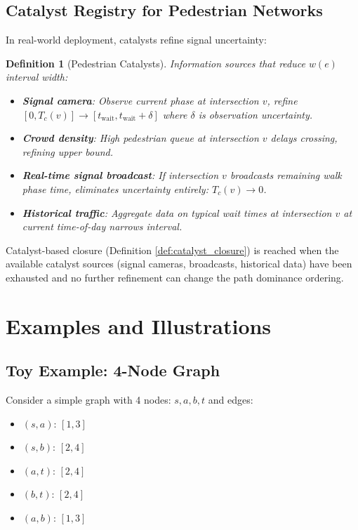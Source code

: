 \documentclass[twocolumn,11pt,a4paper]{article}
\newtheorem{definition}[theorem]{Definition}
\theoremstyle{definition}
\begin{document}
\subsection{Catalyst Registry for Pedestrian Networks}

In real-world deployment, catalysts refine signal uncertainty:

\begin{definition}[Pedestrian Catalysts]
Information sources that reduce $w(e)$ interval width:
\begin{itemize}
\item \textbf{Signal camera}: Observe current phase at intersection $v$, refine $[0, T_c(v)] \to [t_{\text{wait}}, t_{\text{wait}} + \delta]$ where $\delta$ is observation uncertainty.
\item \textbf{Crowd density}: High pedestrian queue at intersection $v$ delays crossing, refining upper bound.
\item \textbf{Real-time signal broadcast}: If intersection $v$ broadcasts remaining walk phase time, eliminates uncertainty entirely: $T_c(v) \to 0$.
\item \textbf{Historical traffic}: Aggregate data on typical wait times at intersection $v$ at current time-of-day narrows interval.
\end{itemize}
\end{definition}

Catalyst-based closure (Definition \ref{def:catalyst_closure}) is reached when the available catalyst sources (signal cameras, broadcasts, historical data) have been exhausted and no further refinement can change the path dominance ordering.

\section{Examples and Illustrations}

\subsection{Toy Example: 4-Node Graph}

Consider a simple graph with 4 nodes: $s, a, b, t$ and edges:
\begin{itemize}
\item $(s, a)$: $[1, 3]$
\item $(s, b)$: $[2, 4]$
\item $(a, t)$: $[2, 4]$
\item $(b, t)$: $[2, 4]$
\item $(a, b)$: $[1, 3]$
\end{itemize}
\end{document}
